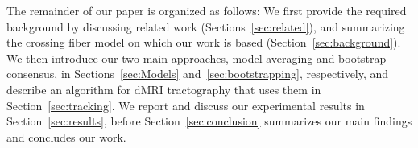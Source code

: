 


The remainder of our paper is organized as follows: We first provide the required background by discussing related work (Sections~\ref{sec:related}), and summarizing the crossing fiber model on which our work is based (Section~\ref{sec:background}). We then introduce our two main approaches, model averaging and bootstrap consensus, in Sections~\ref{sec:Models} and~\ref{sec:bootstrapping}, respectively, and describe an algorithm for dMRI tractography that uses them in Section~\ref{sec:tracking}. We report and discuss our experimental results in Section~\ref{sec:results}, before Section~\ref{sec:conclusion} summarizes our main findings and concludes our work.

